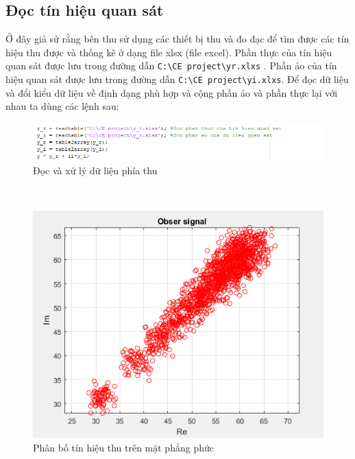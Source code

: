 \documentclass{article}
\begin{document}
\subsection{Đọc tín hiệu quan sát}
Ở đây giả sử rằng bên thu sử dụng các thiết bị thu và đo đạc để tìm được các tín hiệu thu được và thống kê ở dạng file xlsx (file excel). Phần thực của tín hiệu quan sát được lưu trong đường dẫn \texttt{C:\textbackslash CE project\textbackslash yr.xlxs} . Phần ảo của tín hiệu quan sát được lưu trong đường dẫn \texttt{C:\textbackslash CE project\textbackslash yi.xlxs}. Để đọc dữ liệu và đổi kiểu dữ liệu về định dạng phù hợp và cộng phần ảo và phần thực lại với nhau ta dùng các lệnh sau:
\begin{figure}[h!]
    \centering
    \includegraphics[width=14cm]{photo/5.2.1.png}
    \caption{Đọc và xử lý dữ liệu phía thu}
    \label{Hình 17}
\end{figure}\\
\begin{figure}[h!]
    \centering
   \includegraphics[width=12cm]{photo/5.2.2.png}
    \caption{Phân bố tín hiệu thu trên mặt phẳng phức}
    \label{Hình 18}
\end{figure}
\end{document}
